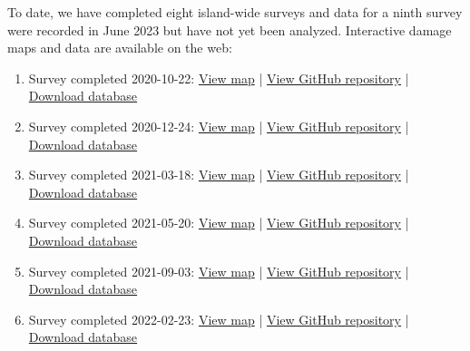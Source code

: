 \documentclass[12pt,letterpaper,english,bibliography=totocnumbered, abstract=on]{scrartcl}
\begin{document}
To date, we have completed eight island-wide surveys and data for a ninth survey were recorded in June 2023 but have not yet been analyzed. Interactive damage maps and data are available on the web: 

\begin{enumerate}
	
	\item Survey completed 2020-10-22: 
	\href{(https://aubreymoore.github.io/new-crb-damage-map}{View map} | \href{https://github.com/aubreymoore/new-crb-damage-map}{View GitHub repository} | \href{https://github.com/aubreymoore/new-crb-damage-map/raw/main/original-map/Guam01.db}{Download database}
	
	\item Survey completed 2020-12-24:
	\href{https://aubreymoore.github.io/Guam-CRB-damage-map-2020-12/webmap/v1}{View map} | 
	\href{https://github.com/aubreymoore/Guam-CRB-damage-map-2020-12)}{View GitHub repository} | 
	\href{https://github.com/aubreymoore/Guam-CRB-damage-map-2020-12/raw/main/Guam02.db}{Download database}
	
	\item Survey completed 2021-03-18: 
	\href{https://aubreymoore.github.io/Guam-CRB-Damage-Map-2021-03}{View map} | 
	\href{https://github.com/aubreymoore/Guam-CRB-damage-map-2021-03}{View GitHub repository} | 
	\href{https://github.com/aubreymoore/Guam-CRB-Damage-Map-2021-03/blob/main/Guam03.zip}{Download database}
	
	\item Survey completed 2021-05-20: 
	\href{https://aubreymoore.github.io/Guam-CRB-Damage-Map-2021-05/webmap}{View map} | 
	\href{https://github.com/aubreymoore/Guam-CRB-Damage-Map-2021-05}{View GitHub repository} | 
	\href{https://github.com/aubreymoore/Guam-CRB-Damage-Map-2021-05/raw/main/Guam04.db}{Download database}
	
	\item Survey completed 2021-09-03: 
	\href{https://aubreymoore.github.io/Guam-CRB-Damage-Map-20021-09/webmap}{View map} | 
	\href{https://github.com/aubreymoore/Guam-CRB-Damage-Map-20021-09}{View GitHub repository} | 
	\href{https://github.com/aubreymoore/Guam-CRB-Damage-Map-20021-09/raw/main/crb-damage-2021-09.db}{Download database}
	
	\item Survey completed 2022-02-23: 
	\href{https://aubreymoore.github.io/Guam-CRB-Damage-Map-2022-02/webmap/#11/13.4483/144.7860}{View map} | 
	\href{https://github.com/aubreymoore/Guam-CRB-Damage-Map-2022-02}{View GitHub repository} | 
	\href{https://github.com/aubreymoore/Guam-CRB-Damage-Map-2022-02/raw/main/Guam-CRB-Damage-Map-2022-02.db}{Download database}
	

\end{enumerate}
\end{document}
